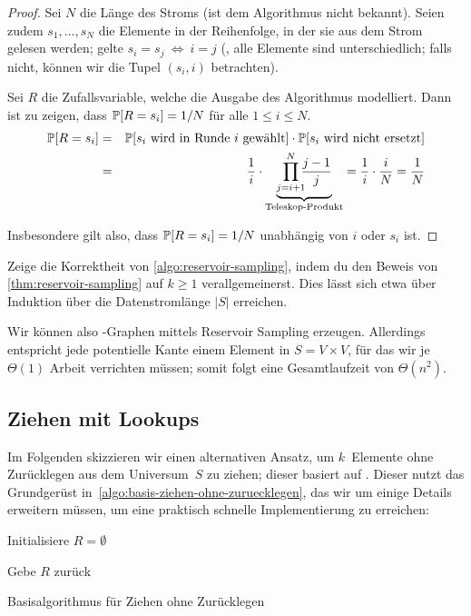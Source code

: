 \begin{proof}
    Sei $N$ die Länge des Stroms (ist dem Algorithmus nicht bekannt).
    Seien zudem $s_1, \ldots, s_N$ die Elemente in der Reihenfolge, in der sie aus dem Strom gelesen werden;
    \oBdA gelte $s_i = s_j \ \Leftrightarrow\ i = j$ (\dh, alle Elemente sind unterschiedlich; falls nicht, können wir die Tupel $(s_i, i)$ betrachten).

    Sei $R$ die Zufallsvariable, welche die Ausgabe des Algorithmus modelliert.
    Dann ist zu zeigen, dass $\mathbb{P}\!\left[R = s_i\right] = 1 / N$ für alle $1 \le i \le N$.
    \begin{eqnarray}
        \prob{R = s_i} &=& \prob{\text{$s_i$ wird in Runde~$i$ gewählt}} \cdot \prob{\text{$s_i$ wird nicht ersetzt}} \\
        &=& \frac{1}{i} \cdot \underbrace{\smashoperator[r]{\prod_{j=i+1}^N} \frac{j-1}{j}}_{\text{Teleskop-Produkt}}
        = \frac{1}{i} \cdot \frac{i}{N} = \frac{1}{N}
    \end{eqnarray}

    \noindent Insbesondere gilt also, dass $\mathbb{P}\!\left[R = s_i\right] = 1/N$ unabhängig von $i$ oder $s_i$ ist.
\end{proof}

\begin{exercise}
    Zeige die Korrektheit von \cref{algo:reservoir-sampling}, indem du den Beweis von \cref{thm:reservoir-sampling} auf $k \ge 1$ verallgemeinerst.
    Dies lässt sich etwa über Induktion über die Datenstromlänge $|S|$ erreichen.
\end{exercise}

Wir können also \Gnm-Graphen mittels Reservoir Sampling erzeugen.
Allerdings entspricht jede potentielle Kante einem Element in $S = V \times V$, für das wir je $\Theta(1)$ Arbeit verrichten müssen;
somit folgt eine Gesamtlaufzeit von $\Theta(n^2)$.

\subsection{Ziehen mit Lookups}
Im Folgenden skizzieren wir einen alternativen Ansatz, um $k$~Elemente ohne Zurücklegen aus dem Universum~$S$ zu ziehen; dieser basiert auf \cite{batagelj2005efficient}.
Dieser nutzt das Grundgerüst in~\cref{algo:basis-ziehen-ohne-zuruecklegen}, das wir um einige Details erweitern müssen, um eine praktisch schnelle Implementierung zu erreichen:

\begin{algorithm}[H]

    Initialisiere $R = \emptyset$\;


    Gebe $R$ zurück

    \caption{Basisalgorithmus für Ziehen ohne Zurücklegen}
    \label{algo:basis-ziehen-ohne-zuruecklegen}
\end{algorithm}

